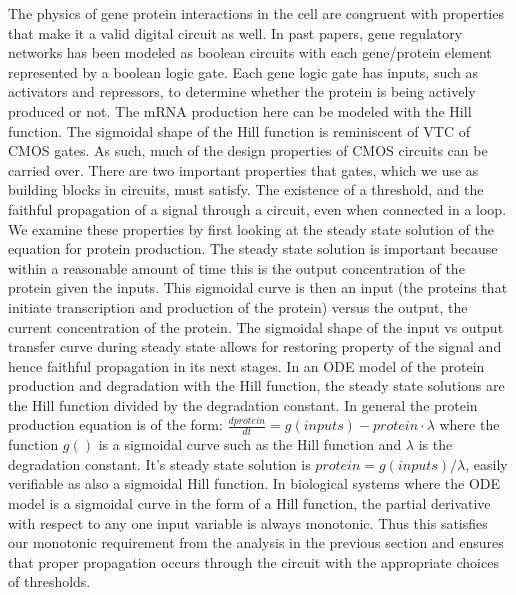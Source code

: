 \documentclass{article}
\begin{document}
The physics of gene protein interactions in the cell are congruent with properties that make it a valid digital circuit as well.  In past papers, gene regulatory networks has been modeled as boolean circuits with each gene/protein element represented by a boolean logic gate.  Each gene logic gate has inputs, such as activators and repressors, to determine whether the protein is being actively produced or not.  The mRNA production here can be modeled with the Hill function.  The sigmoidal shape of the Hill function is reminiscent of VTC of CMOS gates.  As such, much of the design properties of CMOS circuits can be carried over.  There are two important properties that gates, which we use as building blocks in circuits, must satisfy.  The existence of a threshold, and the faithful propagation of a signal through a circuit, even when connected in a loop.  We examine these properties by first looking at the steady state solution of the equation for protein production.  The steady state solution is important because within a reasonable amount of time this is the output concentration of the protein given the inputs. This sigmoidal curve is then an input (the proteins that initiate transcription and production of the protein) versus the output, the current concentration of the protein.  The sigmoidal shape of the input vs output transfer curve during steady state allows for restoring property of the signal and hence faithful propagation in its next stages.   In an ODE model of the protein production and degradation with the Hill function, the steady state solutions are the Hill function divided by the degradation constant.  In general the protein production equation is of the form: $\frac{dprotein}{dt}=g(inputs)-protein\cdot\lambda$  where the function $g()$ is a sigmoidal curve such as the Hill function and $\lambda$ is the degradation constant.  It's steady state solution is $protein=g(inputs)/\lambda$, easily verifiable as also a sigmoidal Hill function.
\newline \newline
 In biological systems where the ODE model is a sigmoidal curve in the form of a Hill function, the partial derivative with respect to any one input variable is always monotonic.  Thus this satisfies our monotonic requirement from the analysis in the previous section and ensures that proper propagation occurs through the circuit with the appropriate choices of thresholds. %
\end{document}
